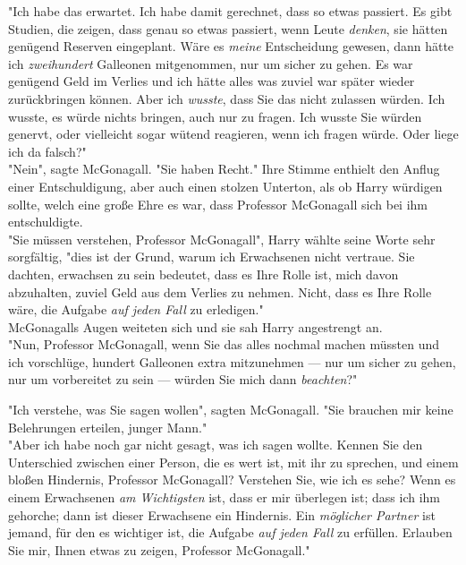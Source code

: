 {"Ich habe das erwartet. Ich habe damit gerechnet, dass so etwas passiert. Es gibt Studien, die zeigen, dass genau so etwas passiert, wenn Leute \emph{denken}, sie hätten genügend Reserven eingeplant. Wäre es \emph{meine} Entscheidung gewesen, dann hätte ich \emph{zweihundert} Galleonen mitgenommen, nur um sicher zu gehen. Es war genügend Geld im Verlies und ich hätte alles was zuviel war später wieder zurückbringen können. Aber ich \emph{wusste}, dass Sie das nicht zulassen würden. Ich wusste, es würde nichts bringen, auch nur zu fragen. Ich wusste Sie würden genervt, oder vielleicht sogar wütend reagieren, wenn ich fragen würde. Oder liege ich da falsch?"\\ "Nein", sagte McGonagall. "Sie haben Recht." Ihre Stimme enthielt den Anflug einer Entschuldigung, aber auch einen stolzen Unterton, als ob Harry würdigen sollte, welch eine große Ehre es war, dass Professor McGonagall sich bei ihm entschuldigte.\\ "Sie müssen verstehen, Professor McGonagall", Harry wählte seine Worte sehr sorgfältig, "dies ist der Grund, warum ich Erwachsenen nicht vertraue. Sie dachten, erwachsen zu sein bedeutet, dass es Ihre Rolle ist, mich davon abzuhalten, zuviel Geld aus dem Verlies zu nehmen. Nicht, dass es Ihre Rolle wäre, die Aufgabe \emph{auf jeden Fall} zu erledigen."\\ McGonagalls Augen weiteten sich und sie sah Harry angestrengt an.\\ "Nun, Professor McGonagall, wenn Sie das alles nochmal machen müssten und ich vorschlüge, hundert Galleonen extra mitzunehmen --- nur um sicher zu gehen, nur um vorbereitet zu sein --- würden Sie mich dann \emph{beachten}?"

"Ich verstehe, was Sie sagen wollen", sagten McGonagall. "Sie brauchen mir keine Belehrungen erteilen, junger Mann."\\ "Aber ich habe noch gar nicht gesagt, was ich sagen wollte. Kennen Sie den Unterschied zwischen einer Person, die es wert ist, mit ihr zu sprechen, und einem bloßen Hindernis, Professor McGonagall? Verstehen Sie, wie ich es sehe? Wenn es einem Erwachsenen \emph{am Wichtigsten} ist, dass er mir überlegen ist; dass ich ihm gehorche; dann ist dieser Erwachsene ein Hindernis. Ein \emph{möglicher Partner} ist jemand, für den es wichtiger ist, die Aufgabe \emph{auf jeden Fall} zu erfüllen. Erlauben Sie mir, Ihnen etwas zu zeigen, Professor McGonagall."

}
